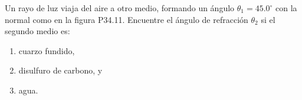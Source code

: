\item Un rayo de luz viaja del aire a otro medio, formando un ángulo $\theta_1 = 45.0^\circ$ con la normal como en la figura P34.11. Encuentre el ángulo de refracción $\theta_2$ si el segundo medio es:
\begin{enumerate}
    \item cuarzo fundido,
    \item disulfuro de carbono, y
    \item agua.
\end{enumerate}